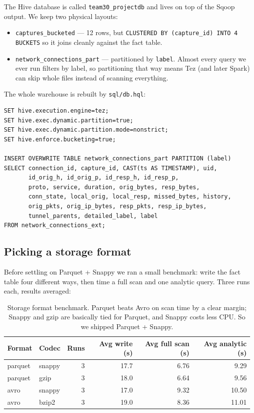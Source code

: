 \documentclass[11pt,a4paper]{article}
\begin{document}
The Hive database is called \texttt{team30\_projectdb} and lives on top of
the Sqoop output. We keep two physical layouts:

\begin{itemize}[leftmargin=2em]
    \item \texttt{captures\_bucketed} --- 12 rows, but
    \texttt{CLUSTERED BY (capture\_id) INTO 4 BUCKETS} so it joins
    cleanly against the fact table.
    \item \texttt{network\_connections\_part} --- partitioned by
    \texttt{label}. Almost every query we ever run filters by label, so
    partitioning that way means Tez (and later Spark) can skip whole files
    instead of scanning everything.
\end{itemize}

The whole warehouse is rebuilt by \texttt{sql/db.hql}:

\begin{lstlisting}
SET hive.execution.engine=tez;
SET hive.exec.dynamic.partition=true;
SET hive.exec.dynamic.partition.mode=nonstrict;
SET hive.enforce.bucketing=true;

INSERT OVERWRITE TABLE network_connections_part PARTITION (label)
SELECT connection_id, capture_id, CAST(ts AS TIMESTAMP), uid,
       id_orig_h, id_orig_p, id_resp_h, id_resp_p,
       proto, service, duration, orig_bytes, resp_bytes,
       conn_state, local_orig, local_resp, missed_bytes, history,
       orig_pkts, orig_ip_bytes, resp_pkts, resp_ip_bytes,
       tunnel_parents, detailed_label, label
FROM network_connections_ext;
\end{lstlisting}

\subsection{Picking a storage format}

Before settling on Parquet + Snappy we ran a small benchmark: write the
fact table four different ways, then time a full scan and one analytic
query. Three runs each, results averaged:

\begin{table}[H]
\centering
\small
\begin{tabular}{llrrrr}
\toprule
\textbf{Format} & \textbf{Codec} & \textbf{Runs} & \textbf{Avg write (s)} & \textbf{Avg full scan (s)} & \textbf{Avg analytic (s)} \\
\midrule
parquet & snappy & 3 & 17.7 & 6.76 & 9.29 \\
parquet & gzip   & 3 & 18.0 & 6.64 & 9.56 \\
avro    & snappy & 3 & 17.0 & 9.32 & 10.50 \\
avro    & bzip2  & 3 & 19.0 & 8.36 & 11.01 \\
\bottomrule
\end{tabular}
\caption{Storage format benchmark. Parquet beats Avro on scan time by a
clear margin; Snappy and gzip are basically tied for Parquet, and Snappy
costs less CPU. So we shipped Parquet + Snappy.}
\end{table}
\end{document}
